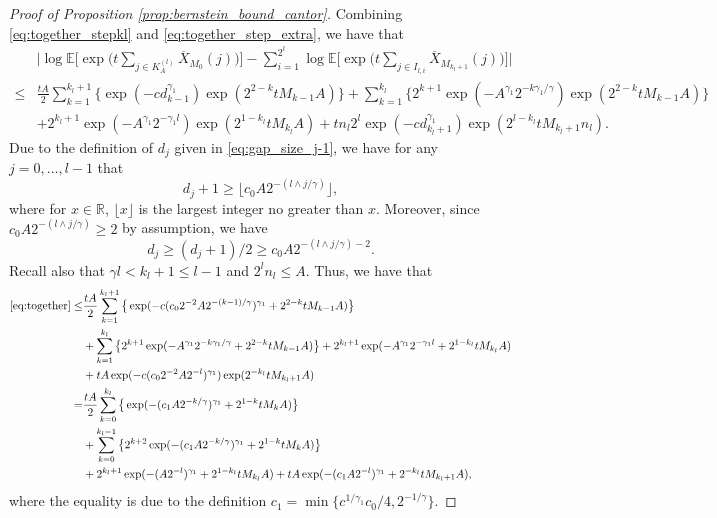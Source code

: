 \documentclass[11pt]{article}
\theoremstyle{plain}
\theoremstyle{definition}
\begin{document}
\begin{proof}[Proof of Proposition \ref{prop:bernstein_bound_cantor}]
    Combining \eqref{eq:together_stepkl} and \eqref{eq:together_step_extra}, we have that
    \begin{align} \label{eq:together}
        &\Big|\log\mathbb{E}\Big[\exp\Big(t\sum_{j \in K_{A}^{(l)}}\overline{X}_{M_0}(j)\Big)\Big] - \sum_{i=1}^{2^{l}}\log\mathbb{E}\Big[\exp\Big( t\sum_{j \in I_{l,i}}\overline{X}_{M_{k_l+1}}(j) \Big)\Big]\Big| \nonumber \\
        \leq& \frac{tA}{2}\sum_{k = 1}^{k_l+1}\big\{\exp(-cd_{k-1}^{\gamma_1})\exp(2^{2-k}tM_{k-1}A)\big\} + \sum_{k = 1}^{k_l}\big\{2^{k+1}\exp(-A^{\gamma_1}2^{-k\gamma_1/\gamma})\exp(2^{2-k}tM_{k-1}A)\big\}\nonumber \\
        &+ 2^{k_l+1}\exp(-A^{\gamma_1}2^{-\gamma_1l})\exp(2^{1-k_l}tM_{k_l}A) + tn_l2^{l}\exp(-cd_{k_l+1}^{\gamma_1})\exp(2^{l-k_l}tM_{k_l+1}n_l).
    \end{align} 
    Due to the definition of $d_j$ given in \eqref{eq:gap_size_j-1}, we have for any $j = 0, \dots, l-1$ that
    \begin{equation*}
        d_j+1 \geq \lfloor c_0A2^{-(l \wedge j/\gamma)} \rfloor,
    \end{equation*}
    where for $x \in \mathbb{R}$, $\lfloor x \rfloor$ is the largest integer no greater than $x$. 
    Moreover, since $c_0A2^{-(l\wedge j/\gamma)} \geq 2$ by assumption, we have
    \begin{equation*}
        d_j \geq (d_j+1)/2 \geq c_0A2^{-(l \wedge j/\gamma)-2}.
    \end{equation*}
    Recall also that $\gamma l < k_l + 1 \leq l-1$ and $2^ln_l \leq A$.
    Thus, we have that
    \begin{align*}
        \eqref{eq:together} \leq& \frac{tA}{2}\sum_{k = 1}^{k_l+1}\big\{\exp(-c(c_02^{-2}A2^{- (k-1)/\gamma})^{\gamma_1} + 2^{2-k}tM_{k-1}A)\big\}\\
        &+ \sum_{k = 1}^{k_l}\big\{2^{k+1}\exp(-A^{\gamma_1}2^{-k\gamma_1/\gamma} + 2^{2-k}tM_{k-1}A)\big\} + 2^{k_l+1}\exp(-A^{\gamma_1}2^{-\gamma_1l}+2^{1-k_l}tM_{k_l}A)\\
        &+ tA\exp(-c(c_02^{-2}A2^{-l})^{\gamma_1})\exp(2^{-k_l}tM_{k_l+1}A)\\
        =& \frac{tA}{2}\sum_{k = 0}^{k_l}\big\{\exp(-(c_1A2^{-k/\gamma})^{\gamma_1} + 2^{1-k}tM_{k}A)\big\}\\
        &+ \sum_{k = 0}^{k_l-1}\big\{2^{k+2}\exp(-(c_1A2^{-k/\gamma})^{\gamma_1} + 2^{1-k}tM_{k}A)\big\}\\
        &+ 2^{k_l+1}\exp(-(A2^{-l})^{\gamma_1}+2^{1-k_l}tM_{k_l}A)+ tA\exp(-(c_1A2^{-l})^{\gamma_1}+2^{-k_l}tM_{k_l+1}A),
    \end{align*}
    where the equality is due to the definition $c_1 = \min\{c^{1/\gamma_1}c_0/4, 2^{-1/\gamma}\}$.
    

\end{proof}
\end{document}
